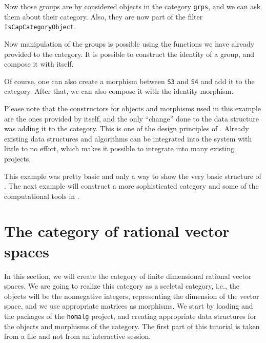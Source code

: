 

Now those groups are by \CapPkg considered objects in the category \texttt{grps}, and we can
ask them about their category. Also, they are now part of the \GAP filter \texttt{IsCapCategoryObject}.



Now manipulation of the groups is possible using the functions we have already provided to the category.
It is possible to construct the identity of a group, and compose it with itself.



Of course, one can also create a morphism between \texttt{S3} and \texttt{S4} and add it to the category.
After that, we can also compose it with the identity morphism.



Please note that the constructors for objects and morphisms used in this example are the ones provided
by \GAP itself, and the only ``change'' done to the data structure was adding it to the category.
This is one of the design principles of \CapPkg. Already existing data structures and algorithms
can be integrated into the system with little to no effort, which makes it possible to integrate \CapPkg
into many existing projects.

This example was pretty basic and only a way to show the very basic structure of \CapPkg. The next example
will construct a more sophisticated category and some of the computational tools in \CapPkg.


\section{The category of rational vector spaces}

In this section, we will create the category of finite dimensional rational vector spaces. We are going
to realize this category as a sceletal category, i.e., the objects will be the nonnegative integers,
representing the dimension of the vector space, and we use appropriate matrices as morphisms. We start
by loading \CapPkg and the packages of the \texttt{homalg} project, and creating appropriate data structures
for the objects and morphisms of the category. The first part of this tutorial is taken from a file and not from
an interactive session.

